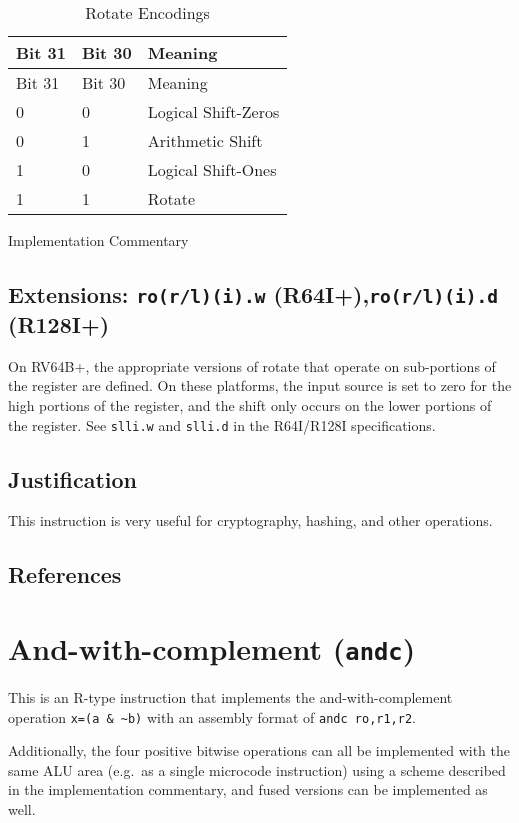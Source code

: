 \begin{longtable}[c]{@{}lll@{}}
\caption{Rotate Encodings}\tabularnewline
\toprule
Bit 31 & Bit 30 & Meaning\tabularnewline
\midrule
\endfirsthead
\toprule
Bit 31 & Bit 30 & Meaning\tabularnewline
\midrule
\endhead
0 & 0 & Logical Shift-Zeros\tabularnewline
0 & 1 & Arithmetic Shift\tabularnewline
1 & 0 & Logical Shift-Ones\tabularnewline
1 & 1 & Rotate\tabularnewline
\bottomrule
\end{longtable}

Implementation Commentary

\subsection{\texorpdfstring{Extensions: \texttt{ro(r/l)(i).w}
(R64I+),\texttt{ro(r/l)(i).d}
(R128I+)}{Extensions: ro(r/l)(i).w (R64I+),ro(r/l)(i).d (R128I+)}}\label{extensions-rorli.w-r64irorli.d-r128i}

On RV64B+, the appropriate versions of rotate that operate on
sub-portions of the register are defined. On these platforms, the input
source is set to zero for the high portions of the register, and the
shift only occurs on the lower portions of the register. See
\texttt{slli.w} and \texttt{slli.d} in the R64I/R128I specifications.

\subsection{Justification}\label{justification-3}

This instruction is very useful for cryptography, hashing, and other
operations.

\subsection{References}\label{references-4}

\section{\texorpdfstring{And-with-complement
(\texttt{andc})}{And-with-complement (andc)}}\label{and-with-complement-andc}



This is an R-type instruction that implements the and-with-complement
operation \texttt{x=(a\ \&\ \textasciitilde{}b)} with an assembly format
of \texttt{andc\ ro,r1,r2}.

Additionally, the four positive bitwise operations can all be
implemented with the same ALU area (e.g.~as a single microcode
instruction) using a scheme described in the implementation commentary,
and fused versions can be implemented as well.

